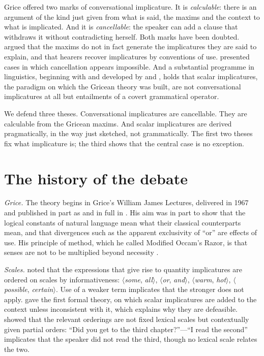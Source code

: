 \documentclass{situationist-preprint}
\begin{document}
Grice offered two marks of conversational implicature. It is \emph{calculable}: there is an argument of the kind just given from what is said, the maxims and the context to what is implicated. And it is \emph{cancellable}: the speaker can add a clause that withdraws it without contradicting herself. Both marks have been doubted. \citet{Davis1998} argued that the maxims do not in fact generate the implicatures they are said to explain, and that hearers recover implicatures by conventions of use. \citet{Weiner2006} presented cases in which cancellation appears impossible. And a substantial programme in linguistics, beginning with \citet{Chierchia2004} and developed by \citet{Fox2007} and \citet{ChierchiaFoxSpector2012}, holds that scalar implicatures, the paradigm on which the Gricean theory was built, are not conversational implicatures at all but entailments of a covert grammatical operator.

We defend three theses. Conversational implicatures are cancellable. They are calculable from the Gricean maxims. And scalar implicatures are derived pragmatically, in the way just sketched, not grammatically. The first two theses fix what implicature is; the third shows that the central case is no exception.

\section{The history of the debate}\label{s:history}

\emph{Grice.} The theory begins in Grice's William James Lectures, delivered in 1967 and published in part as \citet{Grice1975} and in full in \citet{Grice1989}. His aim was in part to show that the logical constants of natural language mean what their classical counterparts mean, and that divergences such as the apparent exclusivity of \enquote{or} are effects of use. His principle of method, which he called Modified Occam's Razor, is that senses are not to be multiplied beyond necessity \citep{Grice1978}.

\emph{Scales.} \citet{Horn1972} noted that the expressions that give rise to quantity implicatures are ordered on scales by informativeness: $\langle$\emph{some}, \emph{all}$\rangle$, $\langle$\emph{or}, \emph{and}$\rangle$, $\langle$\emph{warm}, \emph{hot}$\rangle$, $\langle$\emph{possible}, \emph{certain}$\rangle$. Use of a weaker term implicates that the stronger does not apply. \citet{Gazdar1979} gave the first formal theory, on which scalar implicatures are added to the context unless inconsistent with it, which explains why they are defeasible. \citet{Hirschberg1985} showed that the relevant orderings are not fixed lexical scales but contextually given partial orders: \enquote{Did you get to the third chapter?}---\enquote{I read the second} implicates that the speaker did not read the third, though no lexical scale relates the two.
\end{document}
